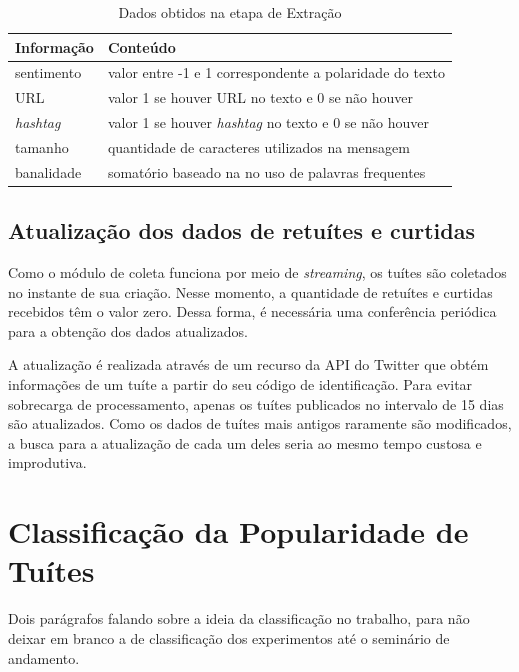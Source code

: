 \documentclass[oneside,openright,12pt]{ufsm_2015} %
\begin{document}
    \begin{table}[ht]
    \centering
    \caption{Dados obtidos na etapa de Extração}
    \label{tab:dados-extracao}
    \begin{tabular}{|l|l|}
    \hline
    \textbf{Informação} & \textbf{Conteúdo} \\ \hline
    sentimento & valor entre -1 e 1 correspondente a polaridade do texto \\ \hline
    URL & valor 1 se houver URL no texto e 0 se não houver \\ \hline
    \textit{hashtag} & valor 1 se houver \textit{hashtag} no texto e 0 se não houver \\ \hline
    tamanho & quantidade de caracteres utilizados na mensagem \\ \hline
    banalidade & somatório baseado na no uso de palavras frequentes \\ \hline
    \end{tabular}
    \end{table}


\subsection{Atualização dos dados de retuítes e curtidas}

    \par Como o módulo de coleta funciona por meio de \textit{streaming}, os tuítes são coletados no instante de sua criação. Nesse momento, a quantidade de retuítes e curtidas recebidos têm o valor zero. Dessa forma, é necessária uma conferência periódica para a obtenção dos dados atualizados.
    
    \par A atualização é realizada através de um recurso da API do Twitter que obtém informações de um tuíte a partir do seu código de identificação. Para evitar sobrecarga de processamento, apenas os tuítes publicados no intervalo de 15 dias são atualizados. Como os dados de tuítes mais antigos raramente são modificados, a busca para a atualização de cada um deles seria ao mesmo tempo custosa e improdutiva.

\section{Classificação da Popularidade de Tuítes}
\label{sec:classificacao-popularidade}

    \par Dois parágrafos falando sobre a ideia da classificação no trabalho, para não deixar em branco a de classificação dos experimentos até o seminário de andamento.
\end{document}

